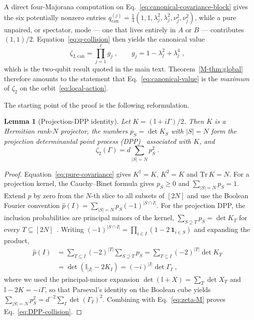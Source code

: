 \documentclass[aps,prl,twocolumn,superscriptaddress,reprint,longbibliography,nofootinbib]{revtex4-2}
\newtheorem{lemma}{Lemma}
\begin{document}
A direct four-Majorana computation on Eq.~\eqref{eq:canonical-covariance-block} gives the six potentially nonzero entries $q^{(j)}_{\mathrm{can}}=\tfrac14(1,1,\lambda_j^2,\lambda_j^2,\nu_j^2,\nu_j^2)$, while a pure unpaired, or spectator, mode --- one that lives entirely in $A$ or $B$ --- contributes $(1,1)/2$. Equation~\eqref{eq:q-collision} then yields the canonical value
\begin{equation}
    \zeta_{2,\mathrm{can}}=\prod_{j=1}^{\ell}g_j\;,\qquad g_j=1-\lambda_j^2+\lambda_j^4\;,
    \label{eq:canonical-value}
\end{equation}
which is the two-qubit result quoted in the main text. Theorem~\ref{M-thm:global} therefore amounts to the statement that Eq.~\eqref{eq:canonical-value} is the \emph{maximum} of $\zeta_2$ on the orbit~\eqref{eq:local-action}.

The starting point of the proof is the following reformulation.

\begin{lemma}[Projection-DPP identity]
\label{lem:DPP}
Let $K=(\mathbb{I}+i\Gamma)/2$. Then $K$ is a Hermitian rank-$N$ projector, the numbers $p_S=\det K_S$ with $|S|=N$ form the projection determinantal point process (DPP)~\cite{collura2026nonstabilizernessfermionicgaussianstates} associated with $K$, and
\begin{equation}
    \zeta_2(\Gamma)=d\sum_{|S|=N}p_S^2\;.
    \label{eq:DPP-collision}
\end{equation}
\end{lemma}

\begin{proof}
Equation~\eqref{eq:pure-covariance} gives $K^\dagger=K$, $K^2=K$ and $\mathrm{Tr}\,K=N$. For a projection kernel, the Cauchy--Binet formula gives $p_S\ge0$ and $\sum_{|S|=N}p_S=1$. Extend $p$ by zero from the $N$-th slice to all subsets of $[2N]$ and use the Boolean Fourier convention $\widehat p(I)=\sum_{|S|=N}p_S(-1)^{|S\cap I|}$. For the projection DPP, the inclusion probabilities are principal minors of the kernel, $\sum_{S\supseteq T}p_S=\det K_T$ for every $T\subseteq[2N]$~\cite{Hough2006}. Writing $(-1)^{|S\cap I|}=\prod_{i\in I}(1-2\,\mathbf{1}_{i\in S})$ and expanding the product,
\begin{equation}
\begin{split}
    \widehat p(I)&=\sum_{T\subseteq I}(-2)^{|T|}\!\!\sum_{S\supseteq T}p_S=\sum_{T\subseteq I}(-2)^{|T|}\det K_T\\
    &=\det(\mathbb{I}_{|I|}-2K_I)=(-i)^{|I|}\det\Gamma_I\;,
\end{split}
\end{equation}
where we used the principal-minor expansion $\det(\mathbb{I}+X)=\sum_{T}\det X_{T}$ and $\mathbb{I}-2K=-i\Gamma$,
so that Parseval's identity on the Boolean cube yields $\sum_{|S|=N}p_S^2=d^{-2}\sum_I\det(\Gamma_I)^2$. Combining with Eq.~\eqref{eq:zeta-M} proves Eq.~\eqref{eq:DPP-collision}.
\end{proof}
\end{document}
